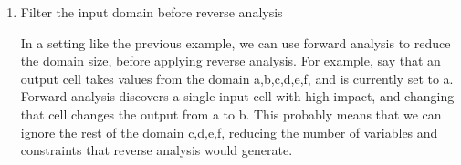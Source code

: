 \begin{enumerate}
	\item Filter the input domain before reverse analysis
	
	
	In a setting like the previous example, we can use forward analysis to reduce the domain size, before applying reverse analysis. For example, say that an output cell takes values from the domain {a,b,c,d,e,f}, and is currently set to a. Forward analysis discovers a single input cell with high impact, and changing that cell changes the output from a to b. This probably means that we can ignore the rest of the domain {c,d,e,f}, reducing the number of variables and constraints  that reverse analysis would generate.
	
\end{enumerate}




